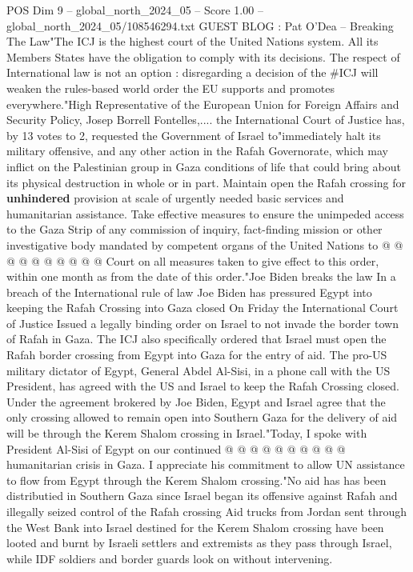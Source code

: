\begin{textsample}{POS Dim 9 – global\_north\_2024\_05 – Score 1.00 – global\_north\_2024\_05/108546294.txt}  \label{ex:f9_pos_299}
GUEST BLOG : Pat O'Dea -- Breaking The Law"The ICJ is the highest court of the United Nations system.
All its Members States have the obligation to comply with its decisions.
The respect of International law is not an option : disregarding a decision of the \#ICJ will weaken the rules-based world order the EU supports and promotes everywhere."High Representative of the European Union for Foreign Affairs and Security Policy, Josep Borrell Fontelles,.... the International Court of Justice has, by 13 votes to 2, requested the Government of Israel to"immediately halt its military offensive, and any other action in the Rafah Governorate, which may inflict on the Palestinian group in Gaza conditions of life that could bring about its physical destruction in whole or in part.
Maintain open the Rafah crossing for \textbf{unhindered} provision at scale of urgently needed basic services and humanitarian assistance.
Take effective measures to ensure the unimpeded access to the Gaza Strip of any commission of inquiry, fact-finding mission or other investigative body mandated by competent organs of the United Nations to @ @ @ @ @ @ @ @ @ @ Court on all measures taken to give effect to this order, within one month as from the date of this order."Joe Biden breaks the law In a breach of the International rule of law Joe Biden has pressured Egypt into keeping the Rafah Crossing into Gaza closed On Friday the International Court of Justice Issued a legally binding order on Israel to not invade the border town of Rafah in Gaza.
The ICJ also specifically ordered that Israel must open the Rafah border crossing from Egypt into Gaza for the entry of aid.
The pro-US military dictator of Egypt, General Abdel Al-Sisi, in a phone call with the US President, has agreed with the US and Israel to keep the Rafah Crossing closed.
Under the agreement brokered by Joe Biden, Egypt and Israel agree that the only crossing allowed to remain open into Southern Gaza for the delivery of aid will be through the Kerem Shalom crossing in Israel."Today, I spoke with President Al-Sisi of Egypt on our continued @ @ @ @ @ @ @ @ @ @ humanitarian crisis in Gaza.
I appreciate his commitment to allow UN assistance to flow from Egypt through the Kerem Shalom crossing."No aid has has been distributied in Southern Gaza since Israel began its offensive against Rafah and illegally seized control of the Rafah crossing Aid trucks from Jordan sent through the West Bank into Israel destined for the Kerem Shalom crossing have been looted and burnt by Israeli settlers and extremists as they pass through Israel, while IDF soldiers and border guards look on without intervening.

\end{textsample}
